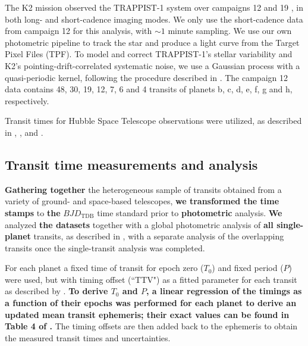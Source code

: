\documentclass[twocolumn]{aastex63}
\begin{document}
The K2 mission \citep{Howell2014} observed the TRAPPIST-1 system over campaigns 12 and 19 \citep{Luger2017a}, in both long- and short-cadence imaging modes. We only use the short-cadence data from campaign 12 for this analysis, with $\sim1$ minute sampling. We use our own photometric pipeline to track the star and produce a light curve from the Target Pixel Files (TPF). To model and correct TRAPPIST-1's stellar variability and K2's pointing-drift-correlated systematic noise, we use a Gaussian process with a quasi-periodic kernel, following the procedure described in \cite{Grimm2018}. The campaign 12 data contains 48, 30, 19, 12, 7, 6 and 4 transits of planets b, c, d, e, f, g and h, respectively. %

Transit times for Hubble Space Telescope observations were utilized, as described in \citet{Grimm2018}, \citet{deWit2016,deWit2018}, and \citet{Wakeford2019}.

\subsection{Transit time measurements and analysis}\label{sec:transit_time_measurements}


\textbf{Gathering together} the heterogeneous sample of transits obtained from a variety of ground- and space-based telescopes,  \textbf{we transformed the time stamps} to \textbf{the} $BJD_\mathrm{TDB}$ time standard prior to \textbf{photometric} analysis. \textbf{We} analyzed \textbf{the datasets} together with a global photometric analysis of \textbf{all single-planet} transits, as described in
\citet{Ducrot2020}, with a separate analysis of the overlapping transits once the single-transit analysis was completed.

For each planet a fixed time of transit for epoch zero ($T_{0}$) and fixed period ($P$) were used, but with timing offset (``TTV") as a fitted parameter for each transit as described by \cite{Ducrot2020}.  \textbf{To derive $T_{0}$ and $P$, a linear regression of the timings as a function of their epochs was performed for each planet to derive an updated mean transit ephemeris; their exact values can be found in Table 4 of \cite{Ducrot2020}.} The timing offsets are then added back to the ephemeris to obtain the measured transit times and uncertainties.
\end{document}
